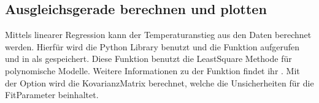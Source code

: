 \documentclass[letterpaper,10pt,english]{jupyterBook}
\begin{document}
\subsection{Ausgleichsgerade berechnen und plotten}
\label{\detokenize{content/T_Plotten:ausgleichsgerade-berechnen-und-plotten}}
\sphinxAtStartPar
Mittels linearer Regression kann der Temperaturanstieg aus den Daten berechnet werden. Hierfür wird die Python Library  benutzt und die Funktion  aufgerufen und in als  gespeichert. Diese Funktion benutzt die Least\sphinxhyphen{}Square Methode für polynomische Modelle. Weitere Informationen zu der Funktion findet ihr . Mit der Option  wird die Kovarianz\sphinxhyphen{}Matrix berechnet, welche die Unsicherheiten für die Fit\sphinxhyphen{}Parameter beinhaltet.
\end{document}
